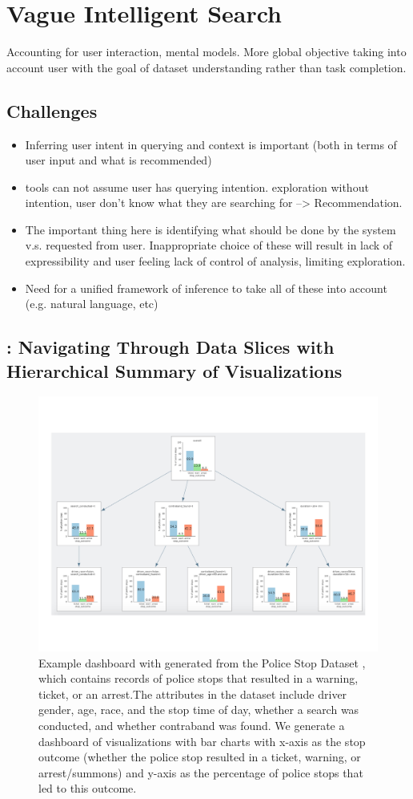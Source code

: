 \section{Vague Intelligent Search\label{sec:vague}}
Accounting for user interaction, mental models. More global objective taking into account user with the goal of dataset understanding rather than task completion.
\subsection{Challenges}
\begin{itemize}
\item Inferring user intent in querying and context is important (both in terms of user input and what is recommended)
\item tools can not assume user has querying intention. exploration without intention, user don’t know what they are searching for --> Recommendation.
\item The important thing here is identifying what should be done by the system v.s. requested from user. Inappropriate choice of these will result in lack of expressibility and user feeling lack of control of analysis, limiting exploration.
\item Need for a unified framework of inference to take all of these into account (e.g. natural language, etc)
\end{itemize}
\subsection{\sbd: Navigating Through Data Slices with Hierarchical Summary of Visualizations}

\begin{figure}[h!]
\label{fig:modalities}
\centering
\includegraphics[width=0.7\linewidth]{figures/storyboard.pdf}
\caption{Example dashboard with generated from the Police Stop Dataset \cite{police}, which contains records of police stops that resulted in a warning, ticket, or an arrest.The attributes in the dataset include driver gender, age, race, and the stop time of day, whether a search was conducted, and whether contraband was found. We generate a dashboard of visualizations with bar charts with x-axis as the stop outcome (whether the police stop resulted in a ticket, warning, or arrest/summons) and y-axis as the percentage of police stops that led to this outcome.}
\end{figure}